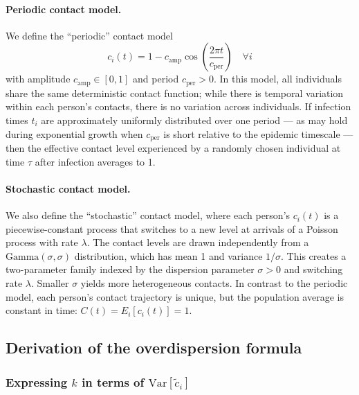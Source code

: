 \documentclass[10pt]{article}
\begin{document}
\paragraph{Periodic contact model.}
We define the ``periodic'' contact model
\begin{equation}
	c_i(t) = 1 - c_\text{amp} \cos\left(\frac{2 \pi t}{c_\text{per}}\right) \quad \forall i
\end{equation}
with amplitude $c_\text{amp} \in [0,1]$ and period $c_\text{per} > 0$. In this model, all individuals share the same deterministic contact function; while there is temporal variation within each person's contacts, there is no variation across individuals. If infection times $t_i$ are approximately uniformly distributed over one period --- as may hold during exponential growth when $c_\text{per}$ is short relative to the epidemic timescale --- then the effective contact level experienced by a randomly chosen individual at time $\tau$ after infection averages to 1.

\paragraph{Stochastic contact model.}
We also define the ``stochastic'' contact model, where each person's $c_i(t)$ is a piecewise-constant process that switches to a new level at arrivals of a Poisson process with rate $\lambda$. The contact levels are drawn independently from a $\text{Gamma}(\sigma, \sigma)$ distribution, which has mean 1 and variance $1/\sigma$. This creates a two-parameter family indexed by the dispersion parameter $\sigma > 0$ and switching rate $\lambda$. Smaller $\sigma$ yields more heterogeneous contacts. In contrast to the periodic model, each person's contact trajectory is unique, but the population average is constant in time: $C(t) = E_i[c_i(t)] = 1$.


\subsection{Derivation of the overdispersion formula}
\label{sec:supp_overdispersion}

\subsubsection{Expressing $k$ in terms of $\text{Var}[\tilde{c}_i]$}
\end{document}

